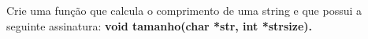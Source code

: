 
\question[10]

Crie uma função que calcula o comprimento de uma string e que possui a seguinte assinatura: \textbf{void tamanho(char *str, int *strsize).}